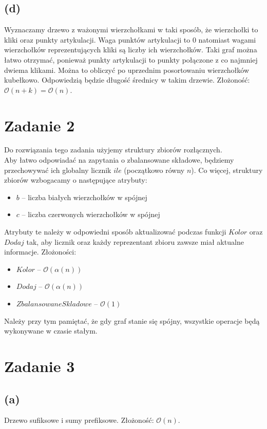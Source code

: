 \documentclass[12pt, a4paper]{article}
\newcommand{\MCALO}{\mathcal{O}}
\begin{document}
\subsection*{(d)}
Wyznaczamy drzewo z ważonymi wierzchołkami w taki sposób, że wierzchołki to
kliki oraz punkty artykulacji. Waga punktów artykulacji to $0$ natomiast wagami
wierzchołków reprezentujących kliki są liczby ich wierzchołków. Taki graf można
łatwo otrzymać, ponieważ punkty artykulacji to punkty połączone z co najmniej
dwiema klikami. Można to obliczyć po uprzednim posortowaniu wierzchołków
kubełkowo. Odpowiedzią będzie długość średnicy w takim drzewie. Złożoność:
$\MCALO(n+k) = \MCALO(n)$.

\newpage
\section*{Zadanie 2}
Do rozwiązania tego zadania użyjemy struktury zbiorów rozłącznych.\\ Aby łatwo
odpowiadać na zapytania o zbalansowane składowe, będziemy przechowywać ich
globalny licznik $ile$ (początkowo równy $n$). Co więcej, struktury zbiorów
wzbogacamy o następujące atrybuty:
\begin{itemize}
  \item $\mathit{b}$ -- liczba białych wierzchołków w spójnej
  \item $\mathit{c}$ -- liczba czerwonych wierzchołków w spójnej
\end{itemize}
Atrybuty te należy w odpowiedni sposób aktualizować podczas funkcji
$\mathit{Kolor}$ oraz $\mathit{Dodaj}$ tak, aby licznik oraz każdy reprezentant
zbioru zawsze miał aktualne informacje. Złożoności: 
\begin{itemize}
  \item $\mathit{Kolor}$ -- $\MCALO(\alpha(n))$
  \item $\mathit{Dodaj}$ -- $\MCALO(\alpha(n))$
  \item $\mathit{ZbalansowaneSkladowe}$ -- $\MCALO(1)$
\end{itemize}
Należy przy tym pamiętać, że gdy graf stanie się spójny, wszystkie operacje
będą wykonywane w czasie stałym.

\section*{Zadanie 3}
\subsection*{(a)}
Drzewo sufiksowe i sumy prefiksowe. Złożoność: $\MCALO(n)$.
\end{document}

